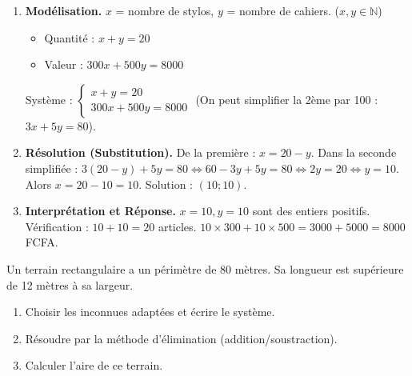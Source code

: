 \documentclass[11pt]{article}
\begin{document}
\begin{corrige}[Exercice 1]
\begin{enumerate}
    \item \textbf{Modélisation.}
    $x$ = nombre de stylos, $y$ = nombre de cahiers. ($x, y \in \mathbb{N}$)
    \begin{itemize}
        \item Quantité : $x + y = 20$
        \item Valeur : $300x + 500y = 8000$
    \end{itemize}
    Système : $\begin{cases} x + y = 20 \\ 300x + 500y = 8000 \end{cases}$ (On peut simplifier la 2ème par 100 : $3x + 5y = 80$).

    \item \textbf{Résolution (Substitution).}
    De la première : $x = 20 - y$.
    Dans la seconde simplifiée : $3(20 - y) + 5y = 80 \iff 60 - 3y + 5y = 80 \iff 2y = 20 \iff y = 10$.
    Alors $x = 20 - 10 = 10$.
    Solution : $(10; 10)$.

    \item \textbf{Interprétation et Réponse.}
    $x=10, y=10$ sont des entiers positifs. Vérification : $10+10=20$ articles. $10\times300 + 10\times500 = 3000+5000=8000$ FCFA.
\end{enumerate}
\end{corrige}

\begin{exercice}
Un terrain rectangulaire a un périmètre de 80 mètres. Sa longueur est supérieure de 12 mètres à sa largeur.
\begin{enumerate}
    \item Choisir les inconnues adaptées et écrire le système.
    \item Résoudre par la méthode d'élimination (addition/soustraction).
    \item Calculer l'aire de ce terrain.
\end{enumerate}
\end{exercice}
\end{document}
